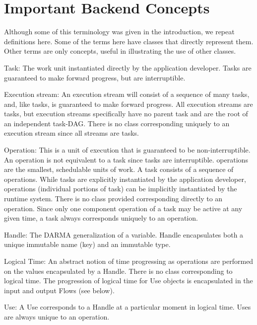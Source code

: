 \section{Important Backend Concepts}
Although some of this terminology was given in the introduction, we repeat definitions here.
Some of the terms here have \CC{} classes that directly represent them.
Other terms are only concepts, useful in illustrating the use of other \CC{} classes.
\begin{compactdesc}
\item [Task:] The work unit instantiated directly by the application developer. 
Tasks are guaranteed to make forward progress, but are interruptible.
\item [Execution stream:] An \gls{execution stream} will consist of a sequence of
  many \glspl{task}, and, like \glspl{task}, is guaranteed to make forward progress.
  All \glspl{execution stream} are \glspl{task}, but \glspl{execution stream} specifically
  have no parent \gls{task} and are the root of an independent \gls{task-DAG}.
  There is no class corresponding uniquely to an \gls{execution stream} since all
streams are \glspl{task}.
\item [Operation:] This is a unit of execution that is guaranteed to be non-interruptible. 
  An \gls{operation} is not equivalent to a \gls{task} since \glspl{task} are interruptible.  
  \Glspl{operation} are the smallest, schedulable units of work.  
A \gls{task} consists of a sequence of \glspl{operation}.
While \glspl{task} are explicitly instantiated by the application developer,
\glspl{operation}
(individual portions of \gls{task}) can be implicitly instantiated by the
\gls{runtime system}.
There is no class provided corresponding directly to an \gls{operation}.
Since only one component \gls{operation} of a \gls{task} may be active at any given
time, a \gls{task} always corresponds uniquely to an \gls{operation}.
\item [Handle:] The \gls{DARMA} generalization of a variable. Handle encapsulates both a unique immutable name (key) and an immutable type. 
\item [Logical Time:] An abstract notion of time progressing as
  \glspl{operation} are performed on the values encapsulated by a Handle.
There is no class corresponding to logical time. 
The progression of logical time for Use objects is encapsulated in the input and output Flows (see below).
\item [Use:] A Use corresponds to a Handle at a particular moment in logical time. 
  Uses are always unique to an \gls{operation}.

\end{compactdesc}
